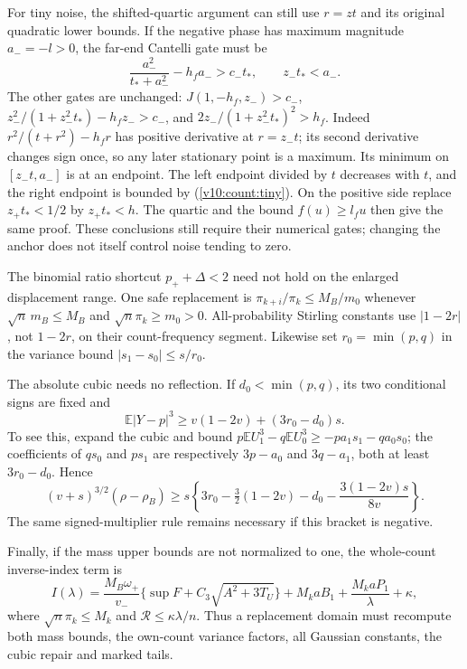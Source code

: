 For tiny noise, the shifted-quartic argument can still use $r=zt$ and
its original quadratic lower bounds. If the negative phase has maximum
magnitude $a_-=-l>0$, the far-end Cantelli gate must be
\begin{equation}\label{v10:count:tiny}
 \frac{a_-^2}{t_*+a_-^2}-h_fa_->c_-t_*,\qquad z_-t_*<a_-.
\end{equation}
The other gates are unchanged:
$J(1,-h_f,z_-)>c_-$,
$z_-^2/(1+z_-^2t_*)-h_fz_->c_-$, and
$2z_-/(1+z_-^2t_*)^2>h_f$.
Indeed $r^2/(t+r^2)-h_fr$ has positive derivative at $r=z_-t$;
its second derivative changes sign once, so any later stationary point
is a maximum. Its minimum on $[z_-t,a_-]$ is at an endpoint. The left
endpoint divided by $t$ decreases with $t$, and the right endpoint is
bounded by (\ref{v10:count:tiny}). On the positive side replace
$z_+t_*<1/2$ by $z_+t_*<h$. The quartic and the bound $f(u)\ge l_fu$
then give the same proof. These conclusions still require their numerical
gates; changing the anchor does not itself control noise tending to zero.

The binomial ratio shortcut $p_++\Delta<2$ need not hold on the enlarged
displacement range. One safe replacement is
$\pi_{k+i}/\pi_k\le M_B/m_0$ whenever
$\sqrt n\,m_B\le M_B$ and $\sqrt n\pi_k\ge m_0>0$.
All-probability Stirling constants use $|1-2r|$, not $1-2r$, on their
count-frequency segment. Likewise set $r_0=\min(p,q)$ in the variance
bound $|s_1-s_0|\le s/r_0$.

The absolute cubic needs no reflection. If $d_0<\min(p,q)$, its two
conditional signs are fixed and
\[
 \mathbb E|Y-p|^3\ge v(1-2v)+(3r_0-d_0)s.
\]
To see this, expand the cubic and bound
$p\mathbb EU_1^3-q\mathbb EU_0^3\ge-pa_1s_1-qa_0s_0$;
the coefficients of $qs_0$ and $ps_1$ are respectively $3p-a_0$ and
$3q-a_1$, both at least $3r_0-d_0$. Hence
\[
 (v+s)^{3/2}(\rho-\rho_B)\ge s\left\{
 3r_0-\tfrac32(1-2v)-d_0-\frac{3(1-2v)s}{8v}\right\}.
\]
The same signed-multiplier rule remains necessary if this bracket is negative.

Finally, if the mass upper bounds are not normalized to one, the whole-count
inverse-index term is
\[
 I(\lambda)=\frac{M_B\omega_+}{v_-}
    \{\sup F+C_3\sqrt{A^2+3T_U}\}
       +M_k aB_1+\frac{M_k aP_1}{\lambda}+\kappa,
\]
where $\sqrt n\pi_k\le M_k$ and $\mathcal R\le\kappa\lambda/n$.
Thus a replacement domain must recompute both mass bounds, the own-count
variance factors, all Gaussian constants, the cubic repair and marked tails.

